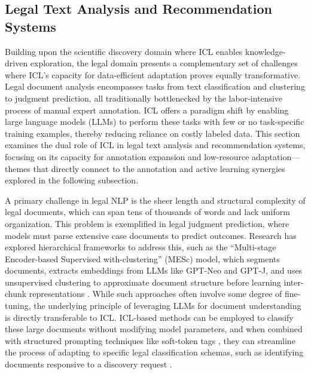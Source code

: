 \documentclass[11pt]{article}
\begin{document}
\subsection{Legal Text Analysis and Recommendation Systems}

Building upon the scientific discovery domain where ICL enables knowledge-driven exploration, the legal domain presents a complementary set of challenges where ICL's capacity for data-efficient adaptation proves equally transformative. Legal document analysis encompasses tasks from text classification and clustering to judgment prediction, all traditionally bottlenecked by the labor-intensive process of manual expert annotation. ICL offers a paradigm shift by enabling large language models (LLMs) to perform these tasks with few or no task-specific training examples, thereby reducing reliance on costly labeled data. This section examines the dual role of ICL in legal text analysis and recommendation systems, focusing on its capacity for annotation expansion and low-resource adaptation---themes that directly connect to the annotation and active learning synergies explored in the following subsection.

A primary challenge in legal NLP is the sheer length and structural complexity of legal documents, which can span tens of thousands of words and lack uniform organization. This problem is exemplified in legal judgment prediction, where models must parse extensive case documents to predict outcomes. Research has explored hierarchical frameworks to address this, such as the ``Multi-stage Encoder-based Supervised with-clustering'' (MESc) model, which segments documents, extracts embeddings from LLMs like GPT-Neo and GPT-J, and uses unsupervised clustering to approximate document structure before learning inter-chunk representations \cite{ref568,ref569}. While such approaches often involve some degree of fine-tuning, the underlying principle of leveraging LLMs for document understanding is directly transferable to ICL. ICL-based methods can be employed to classify these large documents without modifying model parameters, and when combined with structured prompting techniques like soft-token tags \cite{ref570}, they can streamline the process of adapting to specific legal classification schemas, such as identifying documents responsive to a discovery request \cite{ref571}.
\end{document}
